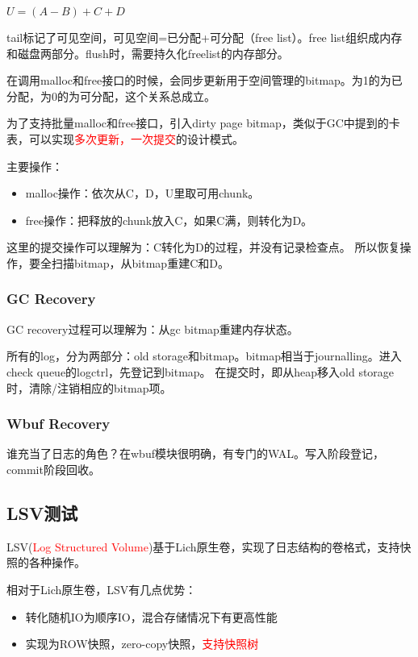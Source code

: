 \documentclass[UTF8]{ctexart}
\begin{document}
 $U = (A - B) + C + D$

tail标记了可见空间，可见空间=已分配+可分配（free list）。free list组织成内存和磁盘两部分。flush时，需要持久化freelist的内存部分。

在调用malloc和free接口的时候，会同步更新用于空间管理的bitmap。为1的为已分配，为0的为可分配，这个关系总成立。

为了支持批量malloc和free接口，引入dirty page bitmap，类似于GC中提到的卡表，可以实现\textcolor{red}{多次更新，一次提交}的设计模式。

主要操作：
\begin{tcolorbox}
\begin{itemize}
    \item malloc操作：依次从C，D，U里取可用chunk。
    \item free操作：把释放的chunk放入C，如果C满，则转化为D。
\end{itemize}
\end{tcolorbox}

这里的提交操作可以理解为：C转化为D的过程，并没有记录检查点。
所以恢复操作，要全扫描bitmap，从bitmap重建C和D。

\subsubsection{GC Recovery}

GC recovery过程可以理解为：从gc bitmap重建内存状态。

所有的log，分为两部分：old storage和bitmap。bitmap相当于journalling。进入check queue的logctrl，先登记到bitmap。
在提交时，即从heap移入old storage时，清除/注销相应的bitmap项。

\subsubsection{Wbuf Recovery}

谁充当了日志的角色？在wbuf模块很明确，有专门的WAL。写入阶段登记，commit阶段回收。

\subsection{LSV测试}

LSV(\textcolor{red}{Log Structured Volume})基于Lich原生卷，实现了日志结构的卷格式，支持快照的各种操作。

相对于Lich原生卷，LSV有几点优势：
\begin{tcolorbox}
    \begin{itemize}
        \item 转化随机IO为顺序IO，混合存储情况下有更高性能
        \item 实现为ROW快照，zero-copy快照，\textcolor{red}{支持快照树}
    \end{itemize}
\end{tcolorbox}
\end{document}

